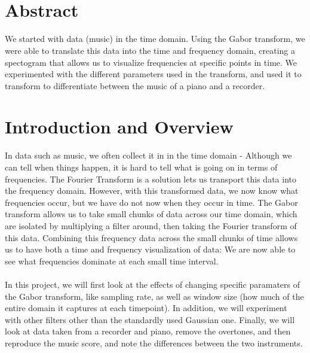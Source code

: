 \documentclass{article}
\title{
    \textmd{\textbf{\text{ } \hmwkTitle}}\\
}
\author{\hmwkAuthorName}
\date{}
\begin{document}
\maketitle

\section*{\fontsize{19}{15}\selectfont Abstract}
	We started with data (music) in the time domain. Using the Gabor transform, we were able to translate this data into the time and frequency domain, creating a spectogram that allows us to visualize frequencies at specific points in time. We experimented with the different parameters used in the transform, and used it to transform to differentiate between the music of a piano and a recorder.
\section*{\fontsize{19}{15}\selectfont Introduction and Overview}
	In data such as music, we often collect it in in the time domain - Although we can tell when things happen, it is hard to tell what is going on in terms of frequencies. The Fourier Transform is a solution lets us transport this data into the frequency domain. However, with this transformed data, we now know what frequencies occur, but we have do not now when they occur in time. The Gabor transform allows us to take small chunks of data across our time domain, which are isolated by multiplying a filter around, then taking the Fourier transform of this data. Combining this frequency data across the small chunks of time allows us to have both a time and frequency visualization of data: We are now able to see what frequencies dominate at each small time interval. \\ \\
	In this project, we will first look at the effects of changing specific paramaters of the Gabor transform, like sampling rate, as well as window size (how much of the entire domain it captures at each timepoint). In addition, we will experiment with other filters other than the standardly used Gaussian one. Finally, we will look at data taken from a recorder and piano, remove the overtones, and then reproduce the music score, and note the differences between the two instruments.
\end{document}
